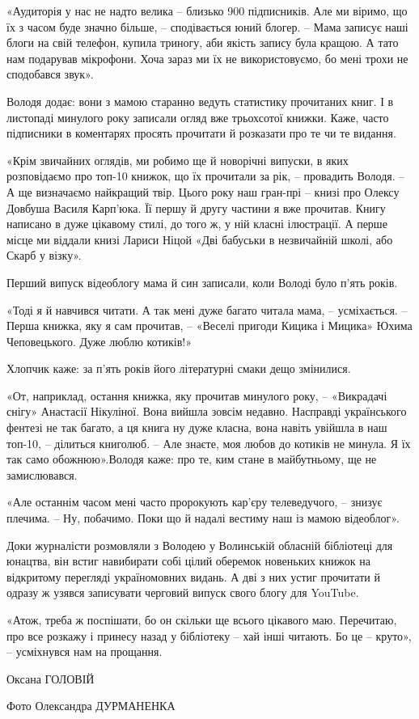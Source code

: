«Аудиторія у нас не надто велика – близько 900 підписників. Але ми віримо, що
їх з часом буде значно більше, – сподівається юний блогер. – Мама записує наші
блоги на свій телефон, купила триногу, аби якість запису була кращою. А тато
нам подарував мікрофони. Хоча зараз ми їх не використовуємо, бо мені трохи не
сподобався звук».

Володя додає: вони з мамою старанно ведуть статистику прочитаних книг. І в
листопаді минулого року записали огляд вже трьохсотої книжки. Каже, часто
підписники в коментарях просять прочитати й розказати про те чи те видання.

«Крім звичайних оглядів, ми робимо ще й новорічні випуски, в яких розповідаємо
про топ-10 книжок, що їх прочитали за рік, – провадить Володя. – А ще
визначаємо найкращий твір. Цього року наш гран-прі – книзі про Олексу Довбуша
Василя Карп’юка. Її першу й другу частини я вже прочитав. Книгу написано в дуже
цікавому стилі, до того ж, у ній класні ілюстрації. А перше місце ми віддали
книзі Лариси Ніцой «Дві бабуськи в незвичайній школі, або Скарб у візку».

Перший випуск відеоблогу мама й син записали, коли Володі було п’ять років.

«Тоді я й навчився читати. А так мені дуже багато читала мама, – усміхається. –
Перша книжка, яку я сам прочитав, – «Веселі пригоди Кицика і Мицика» Юхима
Чеповецького. Дуже люблю котиків!»

Хлопчик каже: за п’ять років його літературні смаки дещо змінилися.

«От, наприклад, остання книжка, яку прочитав минулого року, – «Викрадачі снігу»
Анастасії Нікуліної. Вона вийшла зовсім недавно. Насправді українського фентезі
не так багато, а ця книга ну дуже класна, вона навіть увійшла в наш топ-10, –
ділиться книголюб. – Але знаєте, моя любов до котиків не минула. Я їх так само
обожнюю».Володя каже: про те, ким стане в майбутньому, ще не замислювався.

«Але останнім часом мені часто пророкують кар’єру телеведучого, – знизує
плечима. – Ну, побачимо. Поки що й надалі вестиму наш із мамою відеоблог».


Доки журналісти розмовляли з Володею у Волинській обласній бібліотеці для
юнацтва, він встиг навибирати собі цілий оберемок новеньких книжок на
відкритому перегляді україномовних видань. А дві з них устиг прочитати й одразу
ж узявся записувати черговий випуск свого блогу для YouTube.

«Атож, треба ж поспішати, бо он скільки ще всього цікавого маю. Перечитаю, про
все розкажу і принесу назад у бібліотеку – хай інші читають. Бо це – круто», –
усміхнувся нам на прощання.

Оксана ГОЛОВІЙ

Фото Олександра ДУРМАНЕНКА
